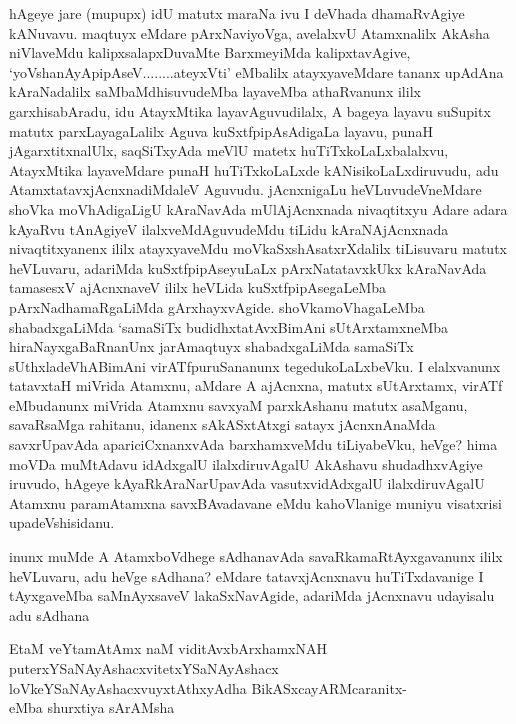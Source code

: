\begin{artha}
hAgeye jare (mupupx) idU matutx maraNa ivu I deVhada dhamaRvAgiye kANuvavu. maqtuyx eMdare pArxNaviyoVga, avelalxvU Atamxnalilx AkAsha niVlaveMdu kalipxsalapxDuvaMte BarxmeyiMda kalipxtavAgive, `yoV\s shanAyApipAseV........ateyxVti' eMbalilx atayxyaveMdare tananx upAdAna kAraNadalilx saMbaMdhisuvudeMba layaveMba athaRvanunx ililx garxhisabAradu, idu AtayxMtika layavAguvudilalx, A bageya layavu suSupitx matutx parxLayagaLalilx Aguva kuSxtfpipAsAdigaLa layavu, punaH jAgarxtitxnalUlx, saqSiTxyAda meVlU matetx huTiTxkoLaLxbalalxvu, AtayxMtika layaveMdare punaH huTiTxkoLaLxde kANisikoLaLxdiruvudu, adu AtamxtatavxjAcnxnadiMdaleV Aguvudu. jAcnxnigaLu heVLuvudeVneMdare shoVka moVhAdigaLigU kAraNavAda mUlAjAcnxnada nivaqtitxyu Adare adara kAyaRvu tAnAgiyeV ilalxveMdAguvudeMdu tiLidu kAraNAjAcnxnada nivaqtitxyanenx ililx atayxyaveMdu moVkaSxshAsatxrXdalilx tiLisuvaru matutx heVLuvaru, adariMda kuSxtfpipAseyuLaLx pArxNatatavxkUkx kAraNavAda tamasesxV ajAcnxnaveV ililx heVLida kuSxtfpipAsegaLeMba pArxNadhamaRgaLiMda gArxhayxvAgide. shoVkamoVhagaLeMba shabadxgaLiMda `samaSiTx budidhxtatAvxBimAni sUtArxtamxneMba hiraNayxgaBaRnanUnx jarAmaqtuyx shabadxgaLiMda samaSiTx sUthxladeVhABimAni virATfpuruSananunx tegedukoLaLxbeVku. I elalxvanunx tatavxtaH miVrida Atamxnu, aMdare A ajAcnxna, matutx sUtArxtamx, virATf eMbudanunx miVrida Atamxnu savxyaM parxkAshanu matutx asaMganu, savaRsaMga rahitanu, idanenx sAkASxtAtxgi satayx jAcnxnAnaMda savxrUpavAda apariciCxnanxvAda barxhamxveMdu tiLiyabeVku, heVge? hima moVDa muMtAdavu idAdxgalU ilalxdiruvAgalU AkAshavu shudadhxvAgiye iruvudo, hAgeye kAyaRkAraNarUpavAda vasutxvidAdxgalU ilalxdiruvAgalU Atamxnu paramAtamxna savxBAvadavane eMdu kahoVlanige muniyu visatxrisi upadeVshisidanu.
\end{artha}


\begin{artha}
inunx muMde A AtamxboVdhege sAdhanavAda savaRkamaRtAyxgavanunx ililx heVLuvaru, adu heVge sAdhana? eMdare \mdash  tatavxjAcnxnavu huTiTxdavanige I tAyxgaveMba saMnAyxsaveV lakaSxNavAgide, adariMda jAcnxnavu udayisalu adu sAdhana \mdash 

EtaM veYtamAtAmx naM viditAvxbArxhamxNAH puterxYSaNAyAshacxvitetxYSaNAyAshacx loVkeYSaNAyAshacxvuyxtAthxyAdha BikASxcayARMcaranitx-\\
eMba shurxtiya sArAMsha \mdash 
\end{artha}

